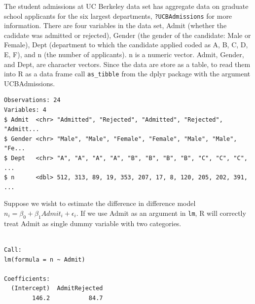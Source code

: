 \documentclass[]{book}
\newenvironment{Shaded}{\begin{snugshade}}{\end{snugshade}}
\newcommand{\KeywordTok}[1]{\textcolor[rgb]{0.13,0.29,0.53}{\textbf{#1}}}
\newcommand{\NormalTok}[1]{#1}
\newcommand{\OperatorTok}[1]{\textcolor[rgb]{0.81,0.36,0.00}{\textbf{#1}}}
\newcommand{\StringTok}[1]{\textcolor[rgb]{0.31,0.60,0.02}{#1}}
\begin{document}
The student admissions at UC Berkeley data set has aggregate data on graduate school applicants for the six largest departments, \texttt{?UCBAdmissions} for more information. There are four variables in the data set, Admit (whether the cadidate was admitted or rejected), Gender (the gender of the candidate: Male or Female), Dept (department to which the candidate applied coded as A, B, C, D, E, F), and n (the number of applicants). n is a numeric vector. Admit, Gender, and Dept, are character vectors. Since the data are store as a table, to read them into R as a data frame call \texttt{as\_tibble} from the dplyr package with the argument UCBAdmissions.

\begin{Shaded}
\end{Shaded}

\begin{verbatim}
Observations: 24
Variables: 4
$ Admit  <chr> "Admitted", "Rejected", "Admitted", "Rejected", "Admitt...
$ Gender <chr> "Male", "Male", "Female", "Female", "Male", "Male", "Fe...
$ Dept   <chr> "A", "A", "A", "A", "B", "B", "B", "B", "C", "C", "C", ...
$ n      <dbl> 512, 313, 89, 19, 353, 207, 17, 8, 120, 205, 202, 391, ...
\end{verbatim}

Suppose we wisht to estimate the difference in difference model \(n_i = \beta_0+\beta_1Admit_i+\epsilon_i\). If we use Admit as an argument in \texttt{lm}, R will correctly treat Admit as single dummy variable with two categories.

\begin{Shaded}
\end{Shaded}

\begin{verbatim}

Call:
lm(formula = n ~ Admit)

Coefficients:
  (Intercept)  AdmitRejected  
        146.2           84.7  
\end{verbatim}
\end{document}
